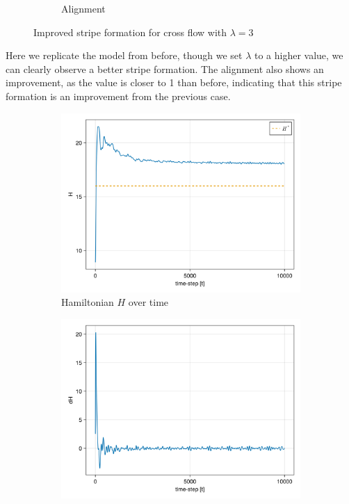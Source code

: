 \begin{itemize}
\begin{figure}[H]
\begin{subfigure}{.49\textwidth}
            \caption{Alignment}
            \label{plot:cross3_alignment}
        \end{subfigure}
        \caption{Improved stripe formation for cross flow with $\lambda = 3$}
        \label{plot:cross3}
    \end{figure}
Here we replicate the model from before, though we set $\lambda$ to a higher value, we can clearly observe a better stripe formation. The alignment also shows an improvement, as the value is closer to 1 than before, indicating that this stripe formation is an improvement from the previous case.

    \begin{figure}[H]
        \centering
        \begin{subfigure}{.49\textwidth}
            \centering
            \includegraphics[width=\linewidth]{figures/ch5_collective/H_cross3.png}
            \caption{Hamiltonian $H$ over time}
            \label{plot:cross3_h}
        \end{subfigure}
        \begin{subfigure}{.49\textwidth}
            \centering
            \includegraphics[width=\linewidth]{figures/ch5_collective/dH_cross3.png}

\end{subfigure}
\end{figure}
\end{itemize}
